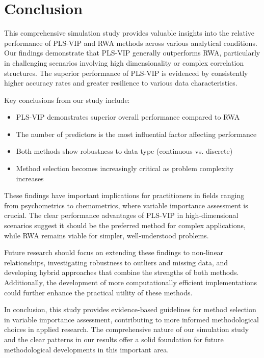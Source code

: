 \section{Conclusion}

This comprehensive simulation study provides valuable insights into the relative performance of PLS-VIP and RWA methods across various analytical conditions. Our findings demonstrate that PLS-VIP generally outperforms RWA, particularly in challenging scenarios involving high dimensionality or complex correlation structures. The superior performance of PLS-VIP is evidenced by consistently higher accuracy rates and greater resilience to various data characteristics.

Key conclusions from our study include:
\begin{itemize}
    \item PLS-VIP demonstrates superior overall performance compared to RWA
    \item The number of predictors is the most influential factor affecting performance
    \item Both methods show robustness to data type (continuous vs. discrete)
    \item Method selection becomes increasingly critical as problem complexity increases
\end{itemize}

These findings have important implications for practitioners in fields ranging from psychometrics to chemometrics, where variable importance assessment is crucial. The clear performance advantages of PLS-VIP in high-dimensional scenarios suggest it should be the preferred method for complex applications, while RWA remains viable for simpler, well-understood problems.

Future research should focus on extending these findings to non-linear relationships, investigating robustness to outliers and missing data, and developing hybrid approaches that combine the strengths of both methods. Additionally, the development of more computationally efficient implementations could further enhance the practical utility of these methods.

In conclusion, this study provides evidence-based guidelines for method selection in variable importance assessment, contributing to more informed methodological choices in applied research. The comprehensive nature of our simulation study and the clear patterns in our results offer a solid foundation for future methodological developments in this important area. 